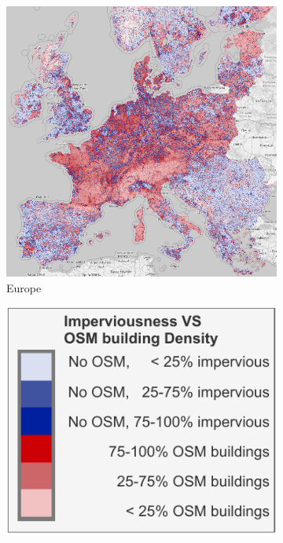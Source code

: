 \begin{figure}[H]
                \begin{subfigure}[t]{0.48\textwidth}
                    \centering
                    \includegraphics[width=\linewidth,height=\linewidth]{figs_06/osm_impcop.png}
                    \caption{Europe}
                    \label{fig:osm_vs_cop_europe1} %
                \end{subfigure}
                \hfill %
                \begin{subfigure}[t]{0.48\textwidth}
                    \centering
                    \includegraphics[width=\linewidth,height=\linewidth]{figs_06/thesis_legends-Imperviousness vs OSM.pdf}

\end{subfigure}
\end{figure}
